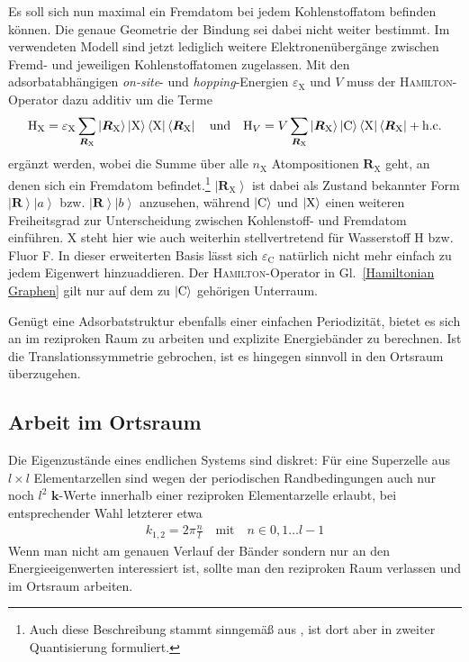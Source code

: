\documentclass[a4paper, 10pt, twoside, openany]{book} %
\newcommand \bra[1]{\left \langle #1 \right |}
\newcommand \ket[1]{\left | #1 \right \rangle}
\def \vec {\boldsymbol}
\newcommand \op[1]{\mathrm{#1}}
\def \eC {\varepsilon_\mathrm{C}}
\def \eX {\varepsilon_\mathrm{X}}
\def \nX {n_\mathrm{X}}
\begin{document}
	Es soll sich nun maximal ein Fremdatom bei jedem Kohlenstoffatom befinden können. Die genaue Geometrie der Bindung sei dabei nicht weiter bestimmt. Im verwendeten Modell sind jetzt lediglich weitere Elektronenübergänge zwischen Fremd- und jeweiligen Kohlenstoffatomen zugelassen. Mit den adsorbatabhängigen \emph{on-site}- und \emph{hopping}-Energien $\eX$ und $V$ muss der \textsc{Hamilton}-Operator dazu additiv um die Terme
	\begin{align*}
		\op H_\text{X} = \eX \sum_{\vec R_\text{X}} \ket{\vec R_\text{X}} \ket{\rm X} \bra{\rm X} \bra{\vec R_\text{X}} \quad \text{und} \quad \op H_V = V \sum_{\vec R_\text{X}} \ket{\vec R_\text{X}} \ket{\rm C} \bra{\rm X} \bra{\vec R_\text{X}} + \text{h.c.}
	\end{align*}
	ergänzt werden, wobei die Summe über alle $\nX$ Atompositionen $\vec R_\text{X}$ geht, an denen sich ein Fremdatom befindet.\footnote{Auch diese Beschreibung stammt sinngemäß aus \cite[S.~2]{Wehling2}, ist dort aber in zweiter Quantisierung formuliert.} $\ket{\vec R_\text{X}}$ ist dabei als Zustand bekannter Form $\ket{\vec R} \ket a$ bzw. $\ket{\vec R} \ket b$ anzusehen, während $\ket{\rm C}$ und $\ket{\rm X}$ einen weiteren Freiheitsgrad zur Unterscheidung zwischen Kohlenstoff- und Fremdatom einführen. X steht hier wie auch weiterhin stellvertretend für Wasserstoff H bzw. Fluor F. In dieser erweiterten Basis lässt sich $\eC$ natürlich nicht mehr einfach zu jedem Eigenwert hinzuaddieren. Der \textsc{Hamilton}-Operator in Gl.~\ref{Hamiltonian Graphen} gilt nur auf dem zu $\ket{\rm C}$ gehörigen Unterraum.
	
	Genügt eine Adsorbatstruktur ebenfalls einer einfachen Periodizität, bietet es sich an im reziproken Raum zu arbeiten und explizite Energiebänder zu berechnen. Ist die Translationssymmetrie gebrochen, ist es hingegen sinnvoll in den Ortsraum überzugehen.
	
	\subsection{Arbeit im Ortsraum}
	
	Die Eigenzustände eines endlichen Systems sind diskret: Für eine Superzelle aus $l \times l$ Elementarzellen sind wegen der periodischen Randbedingungen auch nur noch $l^2$ $\vec k$-Werte innerhalb einer reziproken Elementarzelle erlaubt, bei entsprechender Wahl letzterer etwa
	\begin{align*}
		k_{1, 2} = 2 \pi \frac n l \quad \text{mit} \quad n \in { 0, 1 \dots l - 1 }
	\end{align*}
	Wenn man nicht am genauen Verlauf der Bänder sondern nur an den Energieeigenwerten interessiert ist, sollte man den reziproken Raum verlassen und im Ortsraum arbeiten.
	
\end{document}
